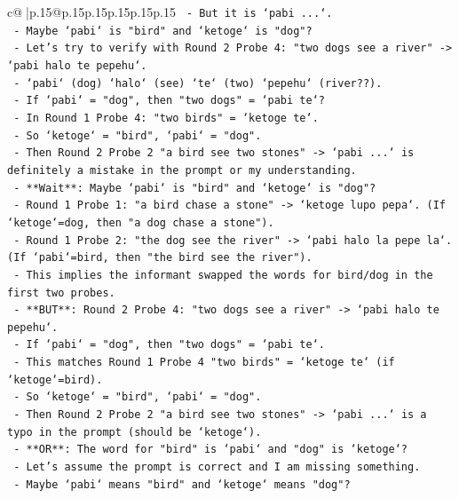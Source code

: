\documentclass{article}
\begin{document}
{\begin{supertabular}{c@{$\;$}|p{.15\linewidth}@{}p{.15\linewidth}p{.15\linewidth}p{.15\linewidth}p{.15\linewidth}p{.15\linewidth}}
{{{\texttt{      {-} But it is `pabi ...`.} \\
\texttt{      {-} Maybe `pabi` is "bird" and `ketoge` is "dog"?} \\
\texttt{      {-} Let's try to verify with Round 2 Probe 4: "two dogs see a river" {-}> `pabi halo te pepehu`.} \\
\texttt{      {-} `pabi` (dog) `halo` (see) `te` (two) `pepehu` (river??).} \\
\texttt{      {-} If `pabi` = "dog", then "two dogs" = `pabi te`?} \\
\texttt{      {-} In Round 1 Probe 4: "two birds" = `ketoge te`.} \\
\texttt{      {-} So `ketoge` = "bird", `pabi` = "dog".} \\
\texttt{      {-} Then Round 2 Probe 2 "a bird see two stones" {-}> `pabi ...` is definitely a mistake in the prompt or my understanding.} \\
\texttt{      {-} **Wait**: Maybe `pabi` is "bird" and `ketoge` is "dog"?} \\
\texttt{      {-} Round 1 Probe 1: "a bird chase a stone" {-}> `ketoge lupo pepa`. (If `ketoge`=dog, then "a dog chase a stone").} \\
\texttt{      {-} Round 1 Probe 2: "the dog see the river" {-}> `pabi halo la pepe la`. (If `pabi`=bird, then "the bird see the river").} \\
\texttt{      {-} This implies the informant swapped the words for bird/dog in the first two probes.} \\
\texttt{      {-} **BUT**: Round 2 Probe 4: "two dogs see a river" {-}> `pabi halo te pepehu`.} \\
\texttt{      {-} If `pabi` = "dog", then "two dogs" = `pabi te`.} \\
\texttt{      {-} This matches Round 1 Probe 4 "two birds" = `ketoge te` (if `ketoge`=bird).} \\
\texttt{      {-} So `ketoge` = "bird", `pabi` = "dog".} \\
\texttt{      {-} Then Round 2 Probe 2 "a bird see two stones" {-}> `pabi ...` is a typo in the prompt (should be `ketoge`).} \\
\texttt{      {-} **OR**: The word for "bird" is `pabi` and "dog" is `ketoge`?} \\
\texttt{      {-} Let's assume the prompt is correct and I am missing something.} \\
\texttt{      {-} Maybe `pabi` means "bird" and `ketoge` means "dog"?} \\
}}}
\end{supertabular}}
\end{document}
